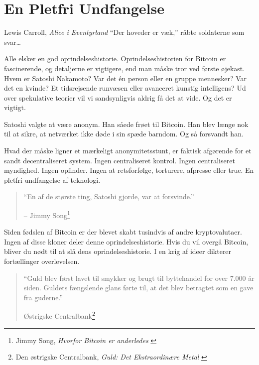 \chapter{En Pletfri Undfangelse}
\label{les:5}

\begin{chapquote}{Lewis Carroll, \textit{Alice i Eventyrland}}
\enquote{Der hoveder er væk,} råbte soldaterne som svar\ldots
\end{chapquote}

Alle elsker en god oprindelseshistorie. Oprindelseshistorien for Bitcoin er 
fascinerende, og detaljerne er vigtigere, end man måske tror ved første 
øjekast. Hvem er Satoshi Nakamoto? Var det én person eller en gruppe mennesker? 
Var det en kvinde? Et tidsrejsende runvæsen eller avanceret kunstig intelligens?
Ud over spekulative teorier vil vi sandsynligvis aldrig få det at vide. 
Og det er vigtigt.

Satoshi valgte at være anonym. Han såede frøet til Bitcoin. Han blev længe nok 
til at sikre, at netværket ikke døde i sin spæde barndom. Og så forsvandt han.

Hvad der måske ligner et mærkeligt anonymitetsstunt, er faktisk afgørende for 
et sandt decentraliseret system. Ingen centraliseret kontrol. Ingen 
centraliseret myndighed. Ingen opfinder. Ingen at retsforfølge, torturere, 
afpresse eller true. En pletfri undfangelse af teknologi.

\begin{quotation}\begin{samepage}
\enquote{En af de største ting, Satoshi gjorde, var at forsvinde.}
\begin{flushright} -- Jimmy Song\footnote{Jimmy Song, \textit{Hvorfor Bitcoin
    er anderledes} \cite{bitcoin-different}}
\end{flushright}\end{samepage}\end{quotation}

\newpage

Siden fødslen af Bitcoin er der blevet skabt tusindvis af andre kryptovalutaer. 
Ingen af disse kloner deler denne oprindelseshistorie. Hvis du vil overgå 
Bitcoin, bliver du nødt til at slå dens oprindelseshistorie. I en krig 
af ideer dikterer fortællinger overlevelsen.

\begin{quotation}\begin{samepage}
\enquote{Guld blev først lavet til smykker og brugt til byttehandel for over 
7.000 år siden. Guldets fængslende glans førte til, at det blev betragtet som 
en gave fra guderne.}
\begin{flushright} Østrigske Centralbank\footnote{Den østrigske Centralbank,
    \textit{Guld: Det Ekstraordinære Metal} \cite{gold-gift-gods}}
\end{flushright}\end{samepage}\end{quotation}

